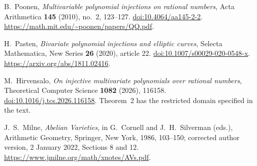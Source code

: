 B.~Poonen, \emph{Multivariable polynomial injections on rational numbers},
Acta Arithmetica \textbf{145} (2010), no.~2, 123--127.
\href{https://doi.org/10.4064/aa145-2-2}{doi:10.4064/aa145-2-2}.
\url{https://math.mit.edu/~poonen/papers/QQ.pdf}.

H.~Pasten, \emph{Bivariate polynomial injections and elliptic curves},
Selecta Mathematica, New Series \textbf{26} (2020), article 22.
\href{https://doi.org/10.1007/s00029-020-0548-x}{doi:10.1007/s00029-020-0548-x}.
\url{https://arxiv.org/abs/1811.02416}.

M.~Hirvensalo, \emph{On injective multivariate polynomials over rational
numbers}, Theoretical Computer Science \textbf{1082} (2026), 116158.
\href{https://doi.org/10.1016/j.tcs.2026.116158}{doi:10.1016/j.tcs.2026.116158}.
Theorem~2 has the restricted domain specified in the text.

J.~S.~Milne, \emph{Abelian Varieties}, in G.~Cornell and J.~H.~Silverman
(eds.), Arithmetic Geometry, Springer, New York, 1986, 103--150;
corrected author version, 2 January 2022, Sections 8 and 12.
\url{https://www.jmilne.org/math/xnotes/AVs.pdf}.
